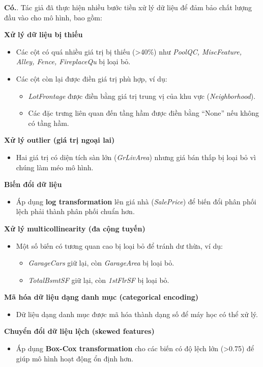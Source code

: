 \textbf{Có.}. Tác giả đã thực hiện nhiều bước tiền xử lý dữ liệu để đảm bảo chất lượng đầu vào cho mô hình, bao gồm:

\textbf{Xử lý dữ liệu bị thiếu}
\begin{itemize}
    \item Các cột có quá nhiều giá trị bị thiếu (>40\%) như \textit{PoolQC, MiscFeature, Alley, Fence, FireplaceQu} bị loại bỏ.
    \item Các cột còn lại được điền giá trị phù hợp, ví dụ:
    \begin{itemize}
        \item \textit{LotFrontage} được điền bằng giá trị trung vị của khu vực (\textit{Neighborhood}).
        \item Các đặc trưng liên quan đến tầng hầm được điền bằng ``None'' nếu không có tầng hầm.
    \end{itemize}
\end{itemize}

\textbf{Xử lý outlier (giá trị ngoại lai)}
\begin{itemize}
    \item Hai giá trị có diện tích sàn lớn (\textit{GrLivArea}) nhưng giá bán thấp bị loại bỏ vì chúng làm méo mô hình.
\end{itemize}

\textbf{Biến đổi dữ liệu}
\begin{itemize}
    \item Áp dụng \textbf{log transformation} lên giá nhà (\textit{SalePrice}) để biến đổi phân phối lệch phải thành phân phối chuẩn hơn.
\end{itemize}

\textbf{Xử lý multicollinearity (đa cộng tuyến)}
\begin{itemize}
    \item Một số biến có tương quan cao bị loại bỏ để tránh dư thừa, ví dụ:
    \begin{itemize}
        \item \textit{GarageCars} giữ lại, còn \textit{GarageArea} bị loại bỏ.
        \item \textit{TotalBsmtSF} giữ lại, còn \textit{1stFlrSF} bị loại bỏ.
    \end{itemize}
\end{itemize}

\textbf{Mã hóa dữ liệu dạng danh mục (categorical encoding)}
\begin{itemize}
    \item Dữ liệu dạng danh mục được mã hóa thành dạng số để máy học có thể xử lý.
\end{itemize}

\textbf{Chuyển đổi dữ liệu lệch (skewed features)}
\begin{itemize}
    \item Áp dụng \textbf{Box-Cox transformation} cho các biến có độ lệch lớn (>0.75) để giúp mô hình hoạt động ổn định hơn.
\end{itemize}
